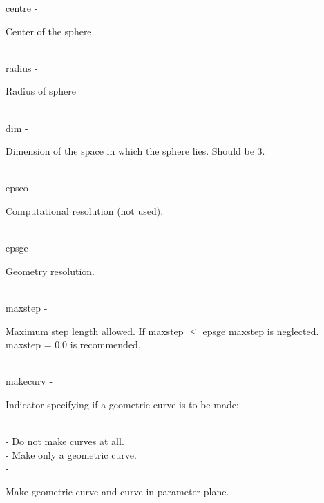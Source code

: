         \>\>    {\fov centre}   \> - \> \begin{minipg2}
                                Center of the sphere.
                                \end{minipg2}\\
        \>\>    {\fov radius}   \> - \> \begin{minipg2}
                                Radius of sphere
                                \end{minipg2}\\
        \>\>    {\fov dim}      \> - \> \begin{minipg2}
                                Dimension of the space in which the sphere lies.
                                Should be 3.
                                \end{minipg2}\\[0.8ex]
        \>\>    {\fov epsco}    \> - \> \begin{minipg2}
                                Computational resolution (not used).
                                \end{minipg2}\\
        \>\>    {\fov epsge}    \> - \> \begin{minipg2}
                                Geometry resolution.
                                \end{minipg2}\\
        \>\>    {\fov maxstep}  \> - \> \begin{minipg2}
                                Maximum step length allowed.
                                If maxstep $\leq$ epsge maxstep is
                                neglected. maxstep = 0.0 is recommended.
                                \end{minipg2}\\[0.3ex]
        \>\>    {\fov makecurv}\> - \>  \begin{minipg2}
                                Indicator specifying if a geometric curve is to be made:
                                \end{minipg2}\\
                \>\>\>\> -     \>Do not make curves at all.\\
                \>\>\>\> -     \>Make only a geometric curve.\\
                \>\>\>\> -     \>\begin{minipg5}
                                        Make geometric curve and curve in parameter
                                        plane.
                                        \end{minipg5} \\[0.3ex]
